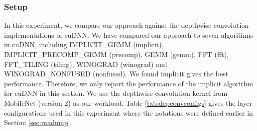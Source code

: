 %	
%


\subsubsection{Setup} In this experiment, we compare our approach against the depthwise convolution implementations of cuDNN.
We have compared our approach to seven algorithms in cuDNN, including IMPLICIT\_GEMM (implicit), IMPLICIT\_PRECOMP\_GEMM (precomp), GEMM
(gemm), FFT (fft), FFT\_TILING (tiling), WINOGRAD (winograd) and WINOGRAD\_NONFUSED (nonfused). We found implicit gives the best
performance. Therefore, we only report the performance of the implicit algorithm for cuDNN in this section. We use the depthwise
convolution kernel from MobileNet (version 2) as our workload. Table \ref{tab:depconvconfigs} gives the layer configurations used in this
experiment where the notations were defined earlier in Section \ref{sec:roadmap}.


